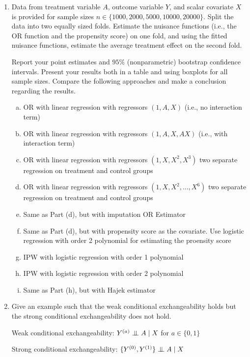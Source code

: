 \documentclass[10pt]{article}
\newcommand{\independent}{\perp\mkern-9.5mu\perp}
\begin{document}
\begin{enumerate}

\item Data from treatment variable $A$, outcome variable $Y$, and scalar covariate $X$ is provided for sample sizes $n\in\{1000,2000,5000,10000,20000\}$. Split the data into two equally sized folds. Estimate the nuisance functions (i.e., the OR function and the propensity score) on one fold, and using the fitted nuisance functions, estimate the average treatment effect on the second fold. 

Report your point estimates and $95\%$ (nonparametric) bootstrap confidence intervals. Present your results both in a table and using boxplots for all sample sizes. Compare the following approaches and make a conclusion regarding the results.
\begin{enumerate}[(a)]
\item OR with linear regression with regressors $(1,A,X)$ (i.e., no interaction term)
\item OR with linear regression with regressors $(1,A,X,AX)$ (i.e., with interaction term)
\item OR with linear regression with regressors $(1,X,X^2,X^3)$ two separate regression on treatment and control groups
\item OR with linear regression with regressors $(1,X,X^2,...,X^6)$ two separate regression on treatment and control groups
\item Same as Part (d), but with imputation OR Estimator
\item Same as Part (d), but with propensity score as the covariate. Use logistic regression with order 2 polynomial for estimating the proensity score
\item IPW with logistic regression with order 1 polynomial
\item IPW with logistic regression with order 2 polynomial
\item Same as Part (h), but with Hajek estimator
\end{enumerate}

\item Give an example such that the weak conditional exchangeability holds but the strong conditional exchangeability does not hold.

Weak conditional exchangeability: $Y^{(a)}\independent A\mid X$ for $a\in\{0,1\}$

Strong conditional exchangeability: $\{Y^{(0)},Y^{(1)}\}\independent A\mid X$





\end{enumerate}
\end{document}
